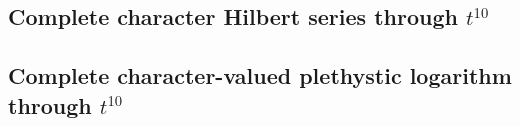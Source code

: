 \documentclass[11pt]{article}
\begin{document}
\clearpage
\begin{landscape}
\section{Complete character Hilbert series through $t^{10}$}
{\small}
\end{landscape}

\clearpage
\begin{landscape}
\section{Complete character-valued plethystic logarithm through $t^{10}$}
{\footnotesize}
\end{landscape}
\end{document}
